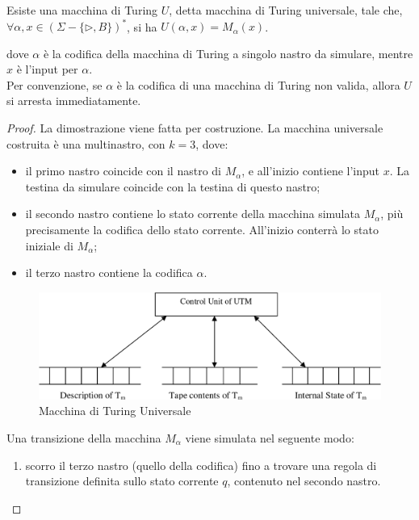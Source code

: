 \begin{thm}
    Esiste una macchina di Turing $U$, detta macchina di Turing universale,
    tale che,
    $\forall \alpha, x \in \left( \Sigma - \{ \triangleright , B \} \right)^*$,
    si ha $U(\alpha, x) = M_{\alpha} (x)$.
\end{thm}
dove $\alpha$ è la codifica della macchina di Turing a singolo nastro da
simulare, mentre $x$ è l'input per $\alpha$.\\
Per convenzione, se $\alpha$ è la codifica di una macchina di Turing non
valida, allora $U$ si arresta immediatamente.

\begin{proof}
    La dimostrazione viene fatta per costruzione.
    La macchina universale costruita è una multinastro, con $k = 3$, dove:
    \begin{itemize}
        \item il primo nastro coincide con il nastro di $M_{\alpha}$, e
        all'inizio contiene l'input $x$. La testina da simulare coincide
        con la testina di questo nastro;
        \item il secondo nastro contiene lo stato corrente della macchina
        simulata $M_{\alpha}$, più precisamente la codifica dello stato
        corrente. All'inizio conterrà lo stato iniziale di $M_{\alpha}$;
        \item il terzo nastro contiene la codifica $\alpha$.
    \end{itemize}
    \begin{figure}[h]
        \centering
        \includegraphics[width=\linewidth]{img/universal_turing_machine.png}
        \caption{Macchina di Turing Universale}
        \label{fig:universal_turing_machine}
    \end{figure}
    Una transizione della macchina $M_{\alpha}$ viene simulata nel
    seguente modo:
    \begin{enumerate}
        \item scorro il terzo nastro (quello della codifica) fino a trovare
        una regola di transizione definita sullo stato corrente $q$,
        contenuto nel secondo nastro.

\end{enumerate}
\end{proof}
